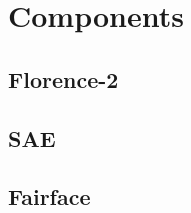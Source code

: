 \documentclass{article}
\begin{document}
\section{Components}
\subsection{Florence-2}
\subsection{SAE}
\subsection{Fairface}




\end{document}
